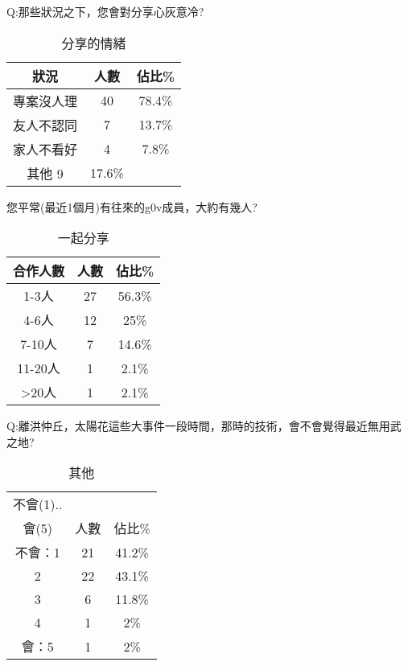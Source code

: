
Q:那些狀況之下，您會對分享心灰意冷?

\begin{center} 
\begin{table}[h]
\centering
\caption{分享的情緒}
\label{4_1_frust}
\begin{tabular}{ccc} \hline
狀況&	人數 &	佔比\% \\ \hline
專案沒人理	&40	&78.4\% \\ \hline
友人不認同	&7	&13.7\% \\ \hline
家人不看好	&4	&7.8\% \\ \hline
其他	9	&17.6\% \\ \hline
\end{tabular}
\end{table}
\end{center}



您平常(最近1個月)有往來的g0v成員，大約有幾人?

\begin{center} 
\begin{table}[h]
\centering
\caption{一起分享}
\label{4_1_withothers}
\begin{tabular}{ccc} \hline
合作人數&	人數 &	佔比\% \\ \hline
1-3人	&27&	56.3\% \\ \hline
4-6人	&12&	25\% \\ \hline
7-10人	&7&	14.6\% \\ \hline
11-20人	&1&	2.1\% \\ \hline
>20人	&1&	2.1\% \\ \hline

\end{tabular}
\end{table}
\end{center}


Q:離洪仲丘，太陽花這些大事件一段時間，那時的技術，會不會覺得最近無用武之地?

\begin{center} 
\begin{table}[h]
\centering
\caption{其他}
\label{4_1_other}
\begin{tabular}{ccc} \hline
不會(1)..\\ 會(5)&	人數 &	佔比\% \\ \hline
不會：1&	21&	41.2\% \\ \hline
2	&22	&43.1\% \\ \hline
3	&6	&11.8\% \\ \hline
4	&1	&2\% \\ \hline
會：5&	1&	2\% \\ \hline

\end{tabular}
\end{table}
\end{center}


